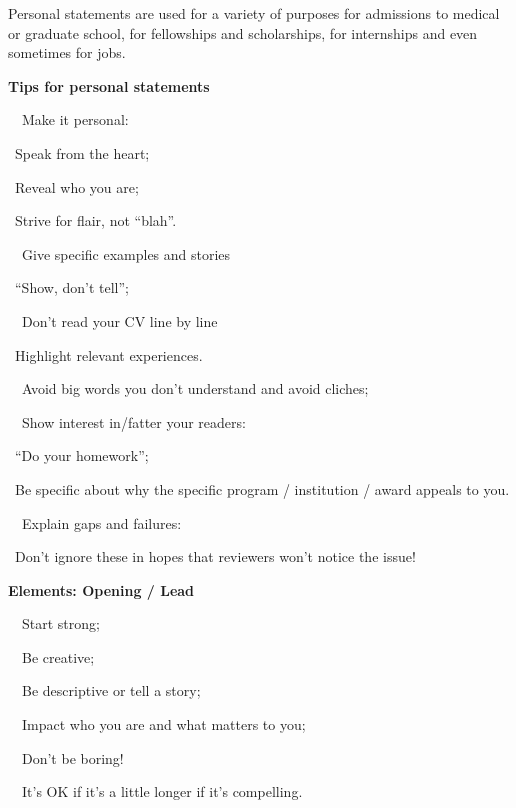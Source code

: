 \documentclass[a4paper, 12pt]{article}
\begin{document}
\par Personal statements are used for a variety of purposes for admissions to medical or graduate school, for fellowships and scholarships, for internships and even sometimes for jobs.

\textbf{Tips for personal statements}
\par\ \textbullet\ Make it personal:
\par\quad\textopenbullet\ Speak from the heart;
\par\quad\textopenbullet\ Reveal who you are;
\par\quad\textopenbullet\ Strive for flair, not ``blah''.
\par\ \textbullet\ Give specific examples and stories
\par\quad\textopenbullet\ ``Show, don't tell'';
\par\ \textbullet\ Don't read your CV line by line
\par\quad\textopenbullet\ Highlight relevant experiences.
\par\ \textbullet\ Avoid big words you don't understand and avoid cliches;
\par\ \textbullet\ Show interest in/fatter your readers:
\par\quad\textopenbullet\ ``Do your homework'';
\par\quad\textopenbullet\ Be specific about why the specific program / institution / award appeals to you.
\par\ \textbullet\ Explain gaps and failures:
\par\quad\textopenbullet\ Don't ignore these in hopes that reviewers won't notice the issue!

\textbf{Elements: Opening / Lead}
\par\ \textbullet\ Start strong;
\par\ \textbullet\ Be creative;
\par\ \textbullet\ Be descriptive or tell a story;
\par\ \textbullet\ Impact who you are and what matters to you;
\par\ \textbullet\ Don't be boring!
\par\ \textbullet\ It's OK if it's a little longer if it's compelling.
\end{document}
